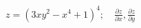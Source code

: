 \item $z = (3xy^2 - x^4 + 1)^4; \quad \frac{\partial z}{\partial x}, \frac{\partial z}{\partial y}$
